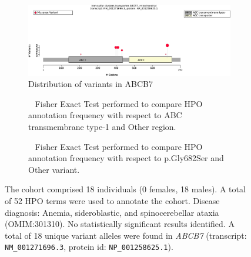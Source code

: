 \begin{figure}[htbp]
\centering
\begin{subfigure}[b]{0.95\textwidth}
\centering
\includegraphics[width=\textwidth]{ img/ABCB7_protein_diagram.pdf} 
\captionsetup{justification=raggedright,singlelinecheck=false}
\caption{Distribution of variants in ABCB7}
\end{subfigure}

\vspace{2em}

\begin{subfigure}[b]{0.95\textwidth}
\centering
{}
\captionsetup{justification=raggedright,singlelinecheck=false}
\caption{         Fisher Exact Test performed to compare HPO annotation frequency with respect to ABC transmembrane type-1 and Other region. }
\end{subfigure}

\vspace{2em}

\begin{subfigure}[b]{0.95\textwidth}
\centering
{}
\captionsetup{justification=raggedright,singlelinecheck=false}
\caption{         Fisher Exact Test performed to compare HPO annotation frequency with respect to p.Gly682Ser and Other variant. }
\end{subfigure}

\vspace{2em}

\caption{ The cohort comprised 18 individuals (0 females, 18 males). A total of 52 HPO terms were used to annotate the cohort. Disease diagnosis: Anemia, sideroblastic, and spinocerebellar ataxia (OMIM:301310). No statistically significant results identified. A total of 18 unique variant alleles were found in \textit{ABCB7} (transcript: \texttt{NM\_001271696.3}, protein id: \texttt{NP\_001258625.1}).}
\end{figure}
